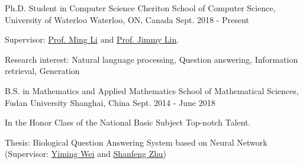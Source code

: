 

\begin{cventries}

 \cventry
    {Ph.D. Student in Computer Science} %
    {Cheriton School of Computer Science, University of Waterloo} %
    {Waterloo, ON, Canada} %
    {Sept. 2018 - Present} %
    {
      \begin{cvitems} %
        \item {Supervisor: {\href{https://cs.uwaterloo.ca/~mli/}{\underline{Prof. Ming Li}}} and {\href{https://cs.uwaterloo.ca/~jimmylin/}{\underline{Prof. Jimmy Lin}}}.}
        \item {Research interest: Natural language processing, Question answering, Information retrieval, Generation }
      \end{cvitems}
    }
      \cventry
    {B.S. in Mathematics and Applied Mathematics} %
    {School of Mathematical Sciences, Fudan University} %
    {Shanghai, China} %
    {Sept. 2014 - June 2018} %
    {
      \begin{cvitems} %
      \item {In the Honor Class of the National Basic Subject Top-notch Talent.}
      \item{Thesis: Biological Question Answering System based on Neural Network (Supervisor: {\href{http://math.fudan.edu.cn/en/Data/View/222}{\underline{Yiming Wei}}} and {\href{https://dblp.org/pers/hd/z/Zhu:Shanfeng}{\underline{Shanfeng Zhu}}})}
      \end{cvitems}
    }

\end{cventries}
